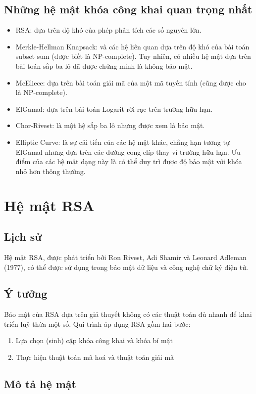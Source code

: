 \documentclass{article}
\begin{document}
\subsection{Những hệ mật khóa công khai quan trọng nhất}
\begin{itemize}
\item RSA: dựa trên độ khó của phép phân tích các số nguyên lớn.
\item Merkle-Hellman Knapsack: và các hệ liên quan dựa trên độ khó của bài toán subset sum (được biết là NP-complete). Tuy nhiên, có nhiều hệ mật dựa trên bài toán sắp ba lô đã được chứng minh là không bảo mật.
\item McEliece: dựa trên bài toán giải mã của một mã tuyến tính (cũng được cho là NP-complete).
\item ElGamal: dựa trên bài toán Logarit rời rạc trên trường hữu hạn.
\item Chor-Rivest: là một hệ sắp ba lô nhưng được xem là bảo mật.
\item Elliptic Curve: là sự cải tiến của các hệ mật khác, chẳng hạn tương tự ElGamal nhưng dựa trên các đường cong elíp thay vì trường hữu hạn. Ưu điểm của các hệ mật dạng này là có thể duy trì được độ bảo mật với khóa nhỏ hơn thông thường.
\end{itemize}

\section{Hệ mật RSA}
\subsection{Lịch sử}
Hệ mật RSA, được phát triển bởi Ron Rivest, Adi Shamir và Leonard Adleman (1977), có thể được sử dụng trong bảo mật dữ liệu và công nghệ chữ ký điện tử.
\subsection{Ý tưởng}
Bảo mật của RSA dựa trên giả thuyết không có các thuật toán đủ nhanh để khai triển luỹ thừa một số. Qui trình áp dụng RSA gồm hai bước:
\begin{enumerate}
\item Lựa chọn (sinh) cặp khóa công khai và khóa bí mật
\item Thực hiện thuật toán mã hoá và thuật toán giải mã
\end{enumerate}

\subsection{Mô tả hệ mật}
\end{document}

